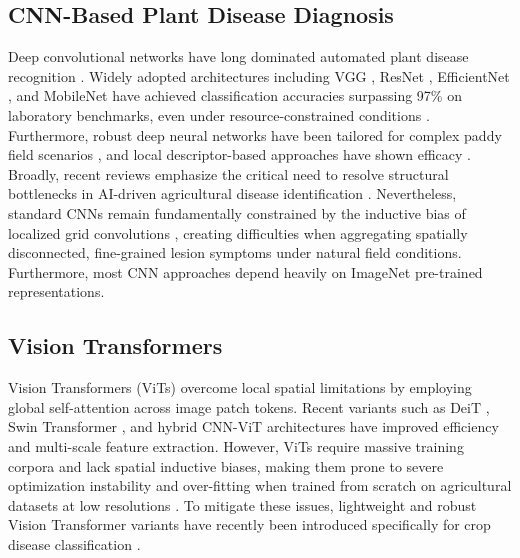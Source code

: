 \documentclass[]{interact}
\theoremstyle{plain}
\theoremstyle{definition}
\theoremstyle{remark}
\begin{document}
\subsection{CNN-Based Plant Disease Diagnosis}
Deep convolutional networks have long dominated automated plant disease recognition \citep{mohanty2016using}. Widely adopted architectures including VGG \citep{ferentinos2018deep}, ResNet \citep{he2016deep, sethy2020deep, singh2024comprehensive}, EfficientNet \citep{tan2019efficientnet}, and MobileNet \citep{chen2021identification, too2019comparative} have achieved classification accuracies surpassing 97\% on laboratory benchmarks, even under resource-constrained conditions \citep{batool2025compact}. Furthermore, robust deep neural networks have been tailored for complex paddy field scenarios \citep{mookkandi2025robustdnn}, and local descriptor-based approaches have shown efficacy \citep{mookkandi2026robust}. Broadly, recent reviews emphasize the critical need to resolve structural bottlenecks in AI-driven agricultural disease identification \citep{nath2026bottleneck}. Nevertheless, standard CNNs remain fundamentally constrained by the inductive bias of localized grid convolutions \citep{lecun1998gradient}, creating difficulties when aggregating spatially disconnected, fine-grained lesion symptoms under natural field conditions. Furthermore, most CNN approaches depend heavily on ImageNet pre-trained representations.

\subsection{Vision Transformers}
Vision Transformers (ViTs) \citep{dosovitskiy2020image} overcome local spatial limitations by employing global self-attention across image patch tokens. Recent variants such as DeiT \citep{touvron2021training}, Swin Transformer \citep{liu2021swin}, and hybrid CNN-ViT architectures \citep{yu2025stcfi} have improved efficiency and multi-scale feature extraction. However, ViTs require massive training corpora and lack spatial inductive biases, making them prone to severe optimization instability and over-fitting when trained from scratch on agricultural datasets at low resolutions \citep{borhani2022deep}. To mitigate these issues, lightweight and robust Vision Transformer variants have recently been introduced specifically for crop disease classification \citep{mookkandi2025robustvit}.
\end{document}
